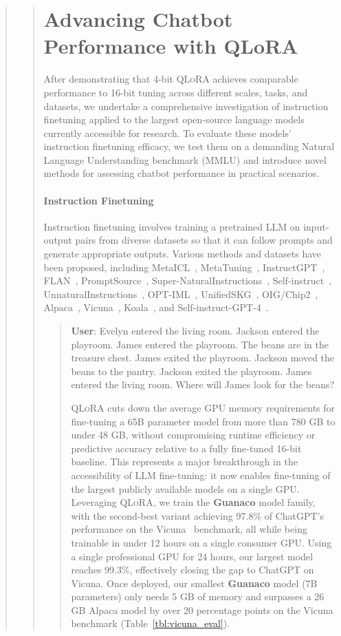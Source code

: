 \begin{quote}
\begin{quote}
\section{Advancing Chatbot Performance with QLoRA}
\label{sec:pushing}
After demonstrating that 4-bit \textsc{QLoRA} achieves comparable performance to 16-bit tuning across different scales, tasks, and datasets, we undertake a comprehensive investigation of instruction finetuning applied to the largest open-source language models currently accessible for research. To evaluate these models' instruction finetuning efficacy, we test them on a demanding Natural Language Understanding benchmark (MMLU) and introduce novel methods for assessing chatbot performance in practical scenarios.

\paragraph{Instruction Finetuning} Instruction finetuning involves training a pretrained LLM on input-output pairs from diverse datasets so that it can follow prompts and generate appropriate outputs. Various methods and datasets have been proposed, including MetaICL~\citep{min2021metaicl}, MetaTuning~\citep{zhong2021adapting}, InstructGPT~\citep{ouyang2022training}, FLAN~\citep{wei2021finetuned,chung2022scaling}, PromptSource~\citep{bach2022promptsource}, Super-NaturalInstructions~\citep{wang2022super,sanh2021multitask}, Self-instruct~\citep{wang2022self}, UnnaturalInstructions~\citep{honovich2022unnatural}, OPT-IML~\citep{iyer2022opt}, UnifiedSKG~\citep{xie2022unifiedskg}, OIG/Chip2~\citep{laion2023}, Alpaca~\citep{alpaca}, Vicuna~\citep{vicuna2023}, Koala~\citep{koala_blogpost_2023}, and Self-instruct-GPT-4~\citep{peng2023instruction}.

\begin{quote}
    \textbf{User}: Evelyn entered the living room. Jackson entered the playroom. James entered the playroom. The beans are in the treasure chest. James exited the playroom. Jackson moved the beans to the pantry. Jackson exited the playroom. James entered the living room. Where will James look for the beans?

\textsc{QLoRA} cuts down the average GPU memory requirements for fine-tuning a 65B parameter model from more than 780 GB to under 48 GB, without compromising runtime efficiency or predictive accuracy relative to a fully fine-tuned 16-bit baseline. This represents a major breakthrough in the accessibility of LLM fine-tuning: it now enables fine-tuning of the largest publicly available models on a single GPU. Leveraging \textsc{QLoRA}, we train the \textbf{Guanaco} model family, with the second-best variant achieving 97.8\% of ChatGPT’s performance on the Vicuna~\citep{vicuna2023} benchmark, all while being trainable in under 12 hours on a single consumer GPU. Using a single professional GPU for 24 hours, our largest model reaches 99.3\%, effectively closing the gap to ChatGPT on Vicuna. Once deployed, our smallest \textbf{Guanaco} model (7B parameters) only needs 5 GB of memory and surpasses a 26 GB Alpaca model by over 20 percentage points on the Vicuna benchmark (Table~\ref{tbl:vicuna_eval}).


\end{quote}
\end{quote}
\end{quote}
